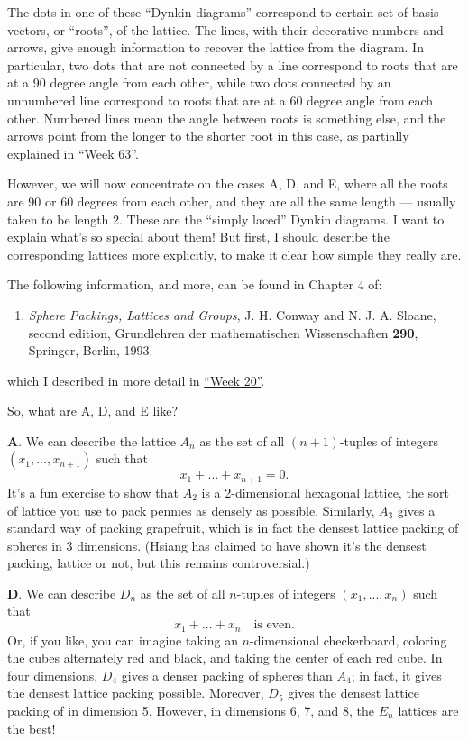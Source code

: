 \documentclass{article}
\def\tightlist{}
\begin{document}
The dots in one of these ``Dynkin diagrams'' correspond to certain set
of basis vectors, or ``roots'', of the lattice. The lines, with their
decorative numbers and arrows, give enough information to recover the
lattice from the diagram. In particular, two dots that are not connected
by a line correspond to roots that are at a 90 degree angle from each
other, while two dots connected by an unnumbered line correspond to
roots that are at a 60 degree angle from each other. Numbered lines mean
the angle between roots is something else, and the arrows point from the
longer to the shorter root in this case, as partially explained in
\protect\hyperlink{week63}{``Week 63''}.

However, we will now concentrate on the cases A, D, and E, where all the
roots are 90 or 60 degrees from each other, and they are all the same
length --- usually taken to be length 2. These are the ``simply laced''
Dynkin diagrams. I want to explain what's so special about them! But
first, I should describe the corresponding lattices more explicitly, to
make it clear how simple they really are.

The following information, and more, can be found in Chapter 4 of:

\begin{enumerate}
\def\labelenumi{\arabic{enumi})}
\tightlist
\item
  \emph{Sphere Packings, Lattices and Groups}, J. H. Conway and N. J. A.
  Sloane, second edition, Grundlehren der mathematischen Wissenschaften
  \textbf{290}, Springer, Berlin, 1993.
\end{enumerate}

which I described in more detail in \protect\hyperlink{week20}{``Week
20''}.

So, what are A, D, and E like?

\textbf{A}. We can describe the lattice \(A_n\) as the set of all
\((n+1)\)-tuples of integers \((x_1,...,x_{n+1})\) such that
\[x_1+\ldots+x_{n+1}=0.\] It's a fun exercise to show that \(A_2\) is a
2-dimensional hexagonal lattice, the sort of lattice you use to pack
pennies as densely as possible. Similarly, \(A_3\) gives a standard way
of packing grapefruit, which is in fact the densest lattice packing of
spheres in 3 dimensions. (Hsiang has claimed to have shown it's the
densest packing, lattice or not, but this remains controversial.)

\textbf{D}. We can describe \(D_n\) as the set of all \(n\)-tuples of
integers \((x_1,...,x_n)\) such that
\[x_1+\ldots+x_n\quad\text{is even}.\] Or, if you like, you can imagine
taking an \(n\)-dimensional checkerboard, coloring the cubes alternately
red and black, and taking the center of each red cube. In four
dimensions, \(D_4\) gives a denser packing of spheres than \(A_4\); in
fact, it gives the densest lattice packing possible. Moreover, \(D_5\)
gives the densest lattice packing of in dimension 5. However, in
dimensions 6, 7, and 8, the \(E_n\) lattices are the best!
\end{document}
